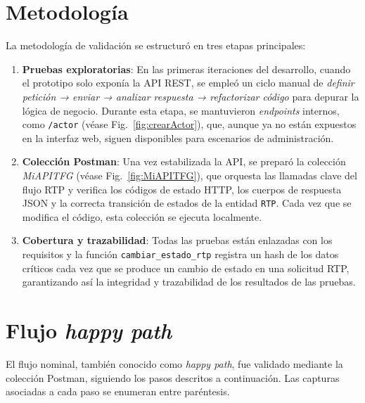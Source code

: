 \section{Metodología}

La metodología de validación se estructuró en tres etapas principales:

\begin{enumerate}
  \item \textbf{Pruebas exploratorias}: En las primeras iteraciones del desarrollo, cuando el prototipo solo exponía la API REST, se empleó un ciclo manual de \textit{definir petición → enviar → analizar respuesta → refactorizar código} para depurar la lógica de negocio. Durante esta etapa, se mantuvieron \textit{endpoints} internos, como \texttt{/actor} (véase Fig.~\ref{fig:crearActor}), que, aunque ya no están expuestos en la interfaz web, siguen disponibles para escenarios de administración.
  
  \item \textbf{Colección Postman}: Una vez estabilizada la API, se preparó la colección \textit{MiAPITFG} (véase Fig.~\ref{fig:MiAPITFG}), que orquesta las llamadas clave del flujo RTP y verifica los códigos de estado HTTP, los cuerpos de respuesta JSON y la correcta transición de estados de la entidad \texttt{RTP}. Cada vez que se modifica el código, esta colección se ejecuta localmente.
  
  \item \textbf{Cobertura y trazabilidad}: Todas las pruebas están enlazadas con los requisitos y la función \texttt{cambiar\_estado\_rtp} registra un hash de los datos críticos cada vez que se produce un cambio de estado en una solicitud RTP, garantizando así la integridad y trazabilidad de los resultados de las pruebas.
\end{enumerate}

\section{Flujo \textit{happy path}}

El flujo nominal, también conocido como \textit{happy path}, fue validado mediante la colección Postman, siguiendo los pasos descritos a continuación. Las capturas asociadas a cada paso se enumeran entre paréntesis.

